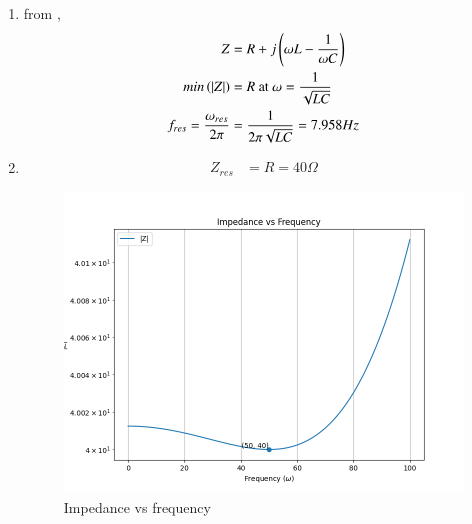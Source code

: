 \documentclass[journal,12pt,twocolumn]{IEEEtran}
\begin{document}
\begin{enumerate}
\item 
from ,
\begin{align}
    Z & = R + j\brak{\omega L - \frac{1}{\omega C}}\\
    min\brak{|Z|} & = R \text{ at } \omega = \frac{1}{\sqrt{LC}}\\ 
    f_{res} = \frac{\omega_{res}}{2\pi} & = \frac{1}{2\pi\sqrt{LC}} = 7.958 Hz \label{217.eq.3}
\end{align}
\item 
\begin{align}
    Z_{res} & = R = 40 \Omega\label{217.eq.4}
\end{align}

\begin{figure}[h]
     \centering
	\includegraphics[width=\columnwidth]{ncert-physics/12/7/11/figs/impedance.png}
     \caption{Impedance vs frequency}
     \label{217.fig.3}
\end{figure}


\end{enumerate}
\end{document}
